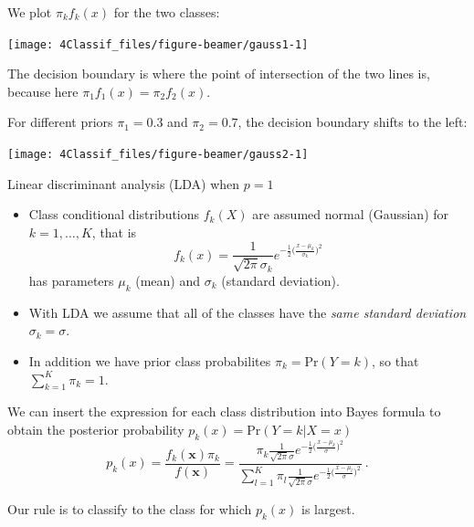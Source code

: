 \documentclass[
  10pt,
  ignorenonframetext,
]{beamer}
\begin{document}
\begin{frame}
We plot \(\pi_k f_k(x)\) for the two classes:

\begin{center}\texttt{[image: 4Classif\_files/figure-beamer/gauss1-1]} \end{center}

The decision boundary is where the point of intersection of the two
lines is, because here \(\pi_1 f_1(x)=\pi_2 f_2(x)\).
\end{frame}

\begin{frame}
For different priors \(\pi_1 = 0.3\) and \(\pi_2 = 0.7\), the decision
boundary shifts to the left:

\begin{center}\texttt{[image: 4Classif\_files/figure-beamer/gauss2-1]} \end{center}
\end{frame}

\begin{frame}{Linear discriminant analysis (LDA) when \(p=1\)}
\protect\hypertarget{linear-discriminant-analysis-lda-when-p1}{}
\begin{itemize}
\item
  Class conditional distributions \(f_k(X)\) are assumed normal
  (Gaussian) for \(k=1,\ldots,K\), that is
  \[f_k(x) = \frac{1}{\sqrt{2\pi}\sigma_k} e^{-\frac{1}{2}\big(\frac{x-\mu_k}{\sigma_k}\big)^2} \]
  has parameters \(\mu_k\) (mean) and \(\sigma_k\) (standard deviation).
\item
  With LDA we assume that all of the classes have the \emph{same
  standard deviation} \(\sigma_k = \sigma\).
\item
  In addition we have prior class probabilites \(\pi_k=\text{Pr}(Y=k)\),
  so that \(\sum_{k=1}^K \pi_k=1\).
\end{itemize}
\end{frame}

\begin{frame}
We can insert the expression for each class distribution into Bayes
formula to obtain the posterior probability
\(p_k(x) = \text{Pr}(Y = k | X = x)\)
\[p_k(x) = \frac{f_k({\boldsymbol x}) \pi_k}{f({\boldsymbol x})}=\frac{\pi_k \frac{1}{\sqrt{2\pi}\sigma} e^{-\frac{1}{2}\big(\frac{x-\mu_k}{\sigma}\big)^2}}{\sum_{l=1}^K \pi_l \frac{1}{\sqrt{2\pi}\sigma} e^{-\frac{1}{2}\big(\frac{x-\mu_l}{\sigma}\big)^2}} \ .\]

Our rule is to classify to the class for which \(p_k(x)\) is largest.
\end{frame}
\end{document}
